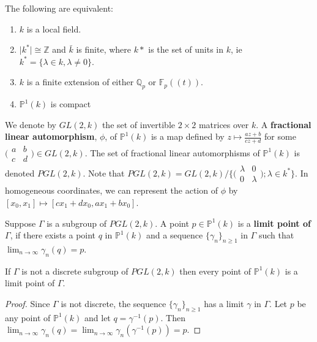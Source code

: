 \begin{proposition*} \cite{gvdp} The following are equivalent:
	\begin{enumerate}
		\item $k$ is a local field.
		\item $\mid k^*\mid \cong \mathbb{Z}$ and $\bar{k}$ is finite, where $k*$ is the set of units in $k$, ie $k^* = \{\lambda \in k, \lambda \neq 0\}$.
		\item $k$ is a finite extension of either $\mathbb{Q}_p$ or $\mathbb{F}_p((t))$.
		\item $\mathbb{P}^1(k)$ is compact
	\end{enumerate}
\end{proposition*}	

\begin{definition*} \cite{gvdp}
	We denote by $GL(2,k)$ the set of invertible $2 \times 2$ matrices over $k$. A \textbf{fractional linear automorphism}, $\phi$, of $\mathbb{P}^1(k)$ is a map  defined by $z \mapsto \frac{az +b}{cz +d}$ for some 
	$\bigl( \begin{smallmatrix}a & b\\ c &d\end{smallmatrix}\bigr) \in GL(2,k)$. The set of fractional linear automorphisms of $\mathbb{P}^1(k)$ is denoted $PGL(2,k)$. Note that $PGL(2,k) = GL(2,k) / \{ \bigl( \begin{smallmatrix}\lambda & 0\\ 0 &\lambda \end{smallmatrix}\bigr); \lambda \in k^*  \}$. In homogeneous coordinates, we can represent the action of $\phi$ by $[x_0,x_1] \mapsto [cx_1 +dx_0, ax_1 +bx_0]$. 
\end{definition*}



\begin{definition*} \cite{gvdp}
	Suppose $\Gamma$ is a subgroup of $PGL(2,k)$. A point $p  \in \mathbb{P}^1(k)$ is a \textbf{limit point of $\Gamma$}, if there exists a point $q$ in  $\mathbb{P}^1(k)$ and a sequence $\{\gamma_n\}_{n\geq 1}$ in $\Gamma$ such that $\lim_{n\to\infty} \gamma_n(q) = p$.
\end{definition*}

\begin{proposition*} \cite{gvdp} If $\Gamma$ is not a discrete subgroup of $PGL(2,k)$ then every point of  $\mathbb{P}^1(k)$ is a limit point of $\Gamma$.
\end{proposition*}	

\begin{proof} 
	Since $\Gamma$ is not discrete, the sequence  $\{\gamma_n\}_{n\geq 1}$ has a limit $\gamma$ in $\Gamma$. Let $p$ be any point of $\mathbb{P}^1(k)$ and let $q= \gamma^{-1}(p)$. Then $\lim_{n\to\infty} \gamma_n(q) = \lim_{n\to\infty} \gamma_n(\gamma^{-1}(p)) =p$. 
\end{proof}	

